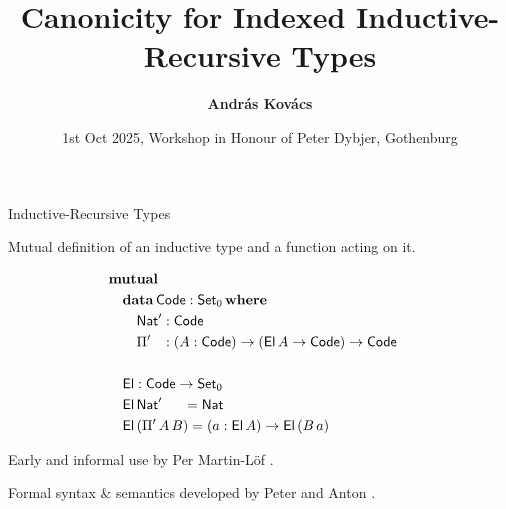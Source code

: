 \documentclass[dvipsnames,aspectratio=169]{beamer}
\title{Canonicity for Indexed Inductive-Recursive Types}
\author{\textbf{András Kovács}}
\institute{
  \inst%
       {University of Gothenburg \& Chalmers University of Technology}
}
\date{1st Oct 2025, Workshop in Honour of Peter Dybjer, Gothenburg}
\newcommand{\ms}[1]{\mathsf{#1}}
\newcommand{\mbf}[1]{\mathbf{#1}}
\newcommand{\data}{\mbf{data}}
\newcommand{\Set}{\ms{Set}}
\newcommand{\where}{\mbf{where}}
\newcommand{\Nat}{\ms{Nat}}
\newcommand{\El}{\ms{El}}
\newcommand{\Code}{\ms{Code}}
\begin{document}
\frame{\titlepage}

\begin{frame}{Inductive-Recursive Types}

Mutual definition of an inductive type and a function acting on it.

\vspace{-1em}
\begin{alignat*}{3}
  & \mbf{mutual} \\
  & \quad\data\,\Code : \Set_0\,\where \\
  & \quad\quad \Nat' : \Code\\
  & \quad\quad \Pi' \hspace{0.8em} : (A : \Code) \to (\El\,A \to \Code) \to \Code
  & \\
  & \\
  & \quad\El : \Code \to \Set_0 \\
  & \quad\El\,\Nat'\hspace{1.5em}  = \Nat \\
  & \quad\El\,(\Pi'\,A\,B) = (a : \El\,A) \to \El\,(B\,a)
\end{alignat*}
\vspace{-0.5em}

Early and informal use by Per Martin-Löf \cite{martin1975intuitionistic,martinlof84sambin}.
\vspace{1em}

Formal syntax \& semantics developed by Peter and Anton \cite{dybjer00ir,dybjer99finite,DBLP:journals/apal/DybjerS03,DBLP:journals/jlp/DybjerS06}.
\vspace{1em}


\end{frame}
\end{document}
